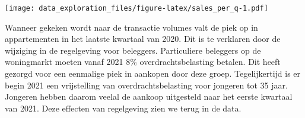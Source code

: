 \documentclass[
]{article}
\newenvironment{Shaded}{\begin{snugshade}}{\end{snugshade}}
\newcommand{\DataTypeTok}[1]{\textcolor[rgb]{0.13,0.29,0.53}{#1}}
\newcommand{\DecValTok}[1]{\textcolor[rgb]{0.00,0.00,0.81}{#1}}
\newcommand{\KeywordTok}[1]{\textcolor[rgb]{0.13,0.29,0.53}{\textbf{#1}}}
\newcommand{\NormalTok}[1]{#1}
\newcommand{\OperatorTok}[1]{\textcolor[rgb]{0.81,0.36,0.00}{\textbf{#1}}}
\newcommand{\StringTok}[1]{\textcolor[rgb]{0.31,0.60,0.02}{#1}}
\begin{document}
\begin{Shaded}
\end{Shaded}

\texttt{[image: data\_exploration\_files/figure-latex/sales\_per\_q-1.pdf]}

Wanneer gekeken wordt naar de transactie volumes valt de piek op in
appartementen in het laatste kwartaal van 2020. Dit is te verklaren door
de wijziging in de regelgeving voor beleggers. Particuliere beleggers op
de woningmarkt moeten vanaf 2021 8\% overdrachtsbelasting betalen. Dit
heeft gezorgd voor een eenmalige piek in aankopen door deze groep.
Tegelijkertijd is er begin 2021 een vrijstelling van
overdrachtsbelasting voor jongeren tot 35 jaar. Jongeren hebben daarom
veelal de aankoop uitgesteld naar het eerste kwartaal van 2021. Deze
effecten van regelgeving zien we terug in de data.
\end{document}
